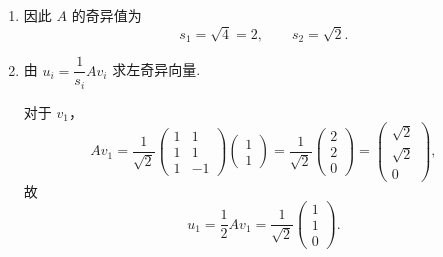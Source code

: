 \begin{solution}
\begin{enumerate}
              对应地，
              \[
                  \lambda = 4 \text{ 时，可取特征向量 } (1, 1)^{\mathrm{T}},
              \]
              \[
                  \lambda = 2 \text{ 时，可取特征向量 } (1, -1)^{\mathrm{T}}.
              \]
              归一化后得到一组标准正交特征向量
              \[
                  v_1 = \frac{1}{\sqrt{2}}\begin{pmatrix}
                      1 \\
                      1
                  \end{pmatrix},\qquad
                  v_2 = \frac{1}{\sqrt{2}}\begin{pmatrix}
                      1  \\
                      -1
                  \end{pmatrix}.
              \]

        \item 因此 $A$ 的奇异值为
              \[
                  s_1 = \sqrt{4} = 2,\qquad s_2 = \sqrt{2}.
              \]

        \item 由 $u_i = \dfrac{1}{s_i}Av_i$ 求左奇异向量.

              对于 $v_1$，
              \[
                  Av_1
                  =
                  \frac{1}{\sqrt{2}}
                  \begin{pmatrix}
                      1 & 1  \\
                      1 & 1  \\
                      1 & -1
                  \end{pmatrix}
                  \begin{pmatrix}
                      1 \\
                      1
                  \end{pmatrix}
                  =
                  \frac{1}{\sqrt{2}}
                  \begin{pmatrix}
                      2 \\
                      2 \\
                      0
                  \end{pmatrix}
                  =
                  \begin{pmatrix}
                      \sqrt{2} \\
                      \sqrt{2} \\
                      0
                  \end{pmatrix},
              \]
              故
              \[
                  u_1 = \frac{1}{2}Av_1
                  =
                  \frac{1}{\sqrt{2}}
                  \begin{pmatrix}
                      1 \\
                      1 \\
                      0
                  \end{pmatrix}.
              \]


\end{enumerate}
\end{solution}
